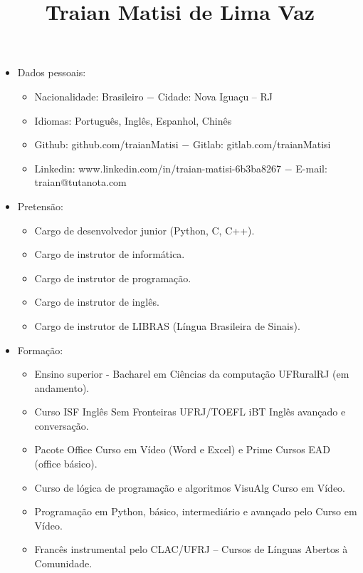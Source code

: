 \documentclass[11pt, a4paper]{article}
\title{Traian Matisi de Lima Vaz}
\date{}
\begin{document}
    \maketitle
    \begin{itemize}
        \item[]Dados pessoais:
            \begin{itemize}
                \item[]Nacionalidade: Brasileiro $-$ Cidade: Nova Iguaçu – RJ
                \item[]Idiomas: Português, Inglês, Espanhol, Chinês
                \item[]Github: github.com/traianMatisi $-$ Gitlab: gitlab.com/traianMatisi
                \item[]Linkedin: www.linkedin.com/in/traian-matisi-6b3ba8267 $-$ E-mail: traian@tutanota.com
            \end{itemize}
        \item[]Pretensão:
            \begin{itemize}
                \item[]Cargo de desenvolvedor junior (Python, C, C++).
                \item[]Cargo de instrutor de informática.
                \item[]Cargo de instrutor de programação.
                \item[]Cargo de instrutor de inglês.
                \item[]Cargo de instrutor de LIBRAS (Língua Brasileira de Sinais).
            \end{itemize}
        \item[]Formação:
            \begin{itemize}
                \item[]Ensino superior - Bacharel em Ciências da computação UFRuralRJ (em andamento).
                \item[]Curso ISF Inglês Sem Fronteiras UFRJ/TOEFL iBT Inglês avançado e conversação.
                \item[]Pacote Office Curso em Vídeo (Word e Excel) e Prime Cursos EAD (office básico).
                \item[]Curso de lógica de programação e algoritmos VisuAlg Curso em Vídeo.
                \item[]Programação em Python, básico, intermediário e avançado pelo Curso em Vídeo.
                \item[]Francês instrumental pelo CLAC/UFRJ – Cursos de Línguas Abertos à Comunidade.

\end{itemize}
\end{itemize}
\end{document}
